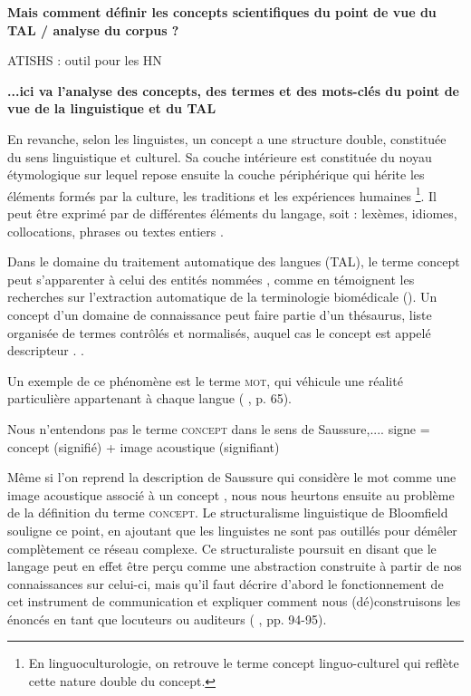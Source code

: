 \textbf{Mais comment définir les concepts scientifiques du point de vue du TAL / analyse du corpus ?}

  
\textsc{ATISHS} : outil pour les HN


\textbf{...ici va l'analyse des concepts, des termes et des mots-clés du point de vue de la linguistique et du TAL}







En revanche, selon les linguistes, un concept a une structure double, constituée du sens linguistique et culturel.
Sa couche intérieure est constituée du noyau étymologique sur lequel repose ensuite la couche périphérique qui hérite les éléments formés par la culture, les traditions et les expériences humaines
\footnote{En linguoculturologie, on retrouve le terme \og{}concept linguo-culturel\fg{} qui reflète cette nature double du concept.}. Il peut être exprimé par de différentes éléments du langage, soit : lexèmes, idiomes, collocations, phrases ou textes entiers \citep[p.~5]{nemickiene2011concept}. 

Dans le domaine du traitement automatique des langues (\textsc{TAL}), le terme \og concept \fg{} peut s'apparenter à celui des \og entités nommées \fg{}, comme en témoignent les recherches sur l'extraction automatique de la terminologie biomédicale (\citealp{jolly2024exploring,navarro2023clinical}). Un concept d'un domaine de connaissance peut faire partie d'un thésaurus, liste organisée de termes contrôlés et normalisés, auquel cas le concept est appelé \og descripteur \fg{}. \citep[p.~16]{RENNESSON202015}.

Un exemple de ce phénomène est le terme \textsc{mot}, qui véhicule une réalité particulière appartenant à chaque langue (\citeauthor{mounin1968clefs} \citeyear{mounin1968clefs}, p. 65). 

Nous n'entendons pas le terme \textsc{concept} dans le sens de Saussure,.... signe = concept (signifié) + image acoustique (signifiant)

Même si l'on reprend la description de Saussure qui considère le mot comme \og une image acoustique associé à un concept \fg{}, nous nous heurtons ensuite au problème de la définition du terme \textsc{concept}. Le structuralisme linguistique de Bloomfield souligne ce point, en ajoutant que les linguistes ne sont pas outillés pour démêler complètement ce réseau complexe. Ce structuraliste poursuit en disant que le langage peut en effet être perçu comme une abstraction construite à partir de nos connaissances sur celui-ci, mais qu'il faut \og décrire d'abord le fonctionnement de cet instrument de communication \fg{} et expliquer comment nous (dé)construisons les énoncés en tant que locuteurs ou auditeurs (\citeauthor{mounin1968clefs} \citeyear{mounin1968clefs}, pp. 94-95).


